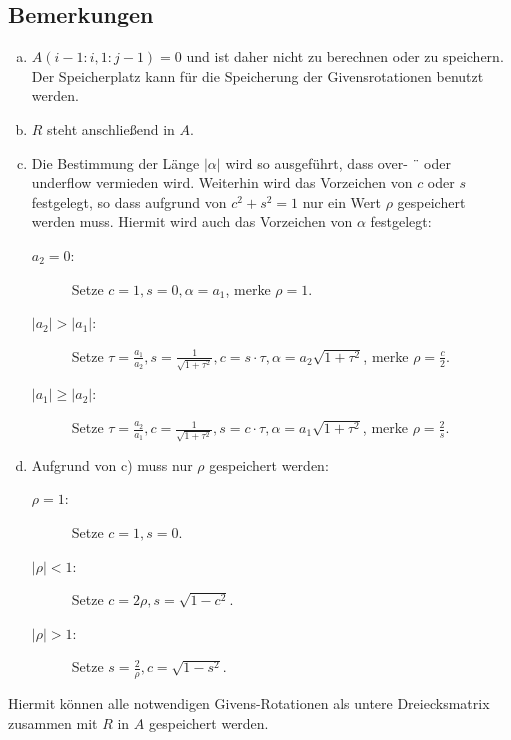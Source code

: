 \documentclass[ngerman,fontsize=11pt, paper=a4, parskip=half, titlepage=true, toc=bib]{scrbook}
\begin{document}
	\subsection{Bemerkungen} 
	\begin{enumerate}[a)]
		\item $A(i-1 : i, 1 : j-1) = 0$ und ist daher nicht zu berechnen oder
					zu speichern. Der Speicherplatz kann für die Speicherung der
					Givensrotationen benutzt werden.
		\item  $R$ steht anschließend in $A$.
		\item Die Bestimmung der Länge $|\alpha|$ wird so ausgeführt, dass over- ¨
				oder underflow vermieden wird. Weiterhin wird das Vorzeichen
				von $c$ oder $s$ festgelegt, so dass aufgrund von $c^2+s^2=1$ nur
				ein Wert $\rho$ gespeichert werden muss. Hiermit wird auch das
				Vorzeichen von $\alpha$ festgelegt:\\
				\begin{description}
					\item[$a_2=0$:] Setze $c=1, s=0, \alpha = a_1$, merke $\rho=1$.
					\item[$|a_2|>|a_1|$:] Setze $\tau= \frac{a_1}{a_2}, s=\frac{1}{\sqrt{1+\tau^2}}, c=s\cdot\tau, \alpha =a_2\sqrt{1+\tau^2}$, merke $\rho=\frac{c}{2}$.
					\item[$|a_1|\geq|a_2|$:] Setze $\tau= \frac{a_2}{a_1}, c=\frac{1}{\sqrt{1+\tau^2}}, s=c\cdot\tau, \alpha =a_1\sqrt{1+\tau^2}$, merke $\rho=\frac{2}{s}$.
				\end{description}
		\item Aufgrund von c) muss nur $\rho$ gespeichert werden:
		\begin{description}
			\item[$\rho=1$:] Setze $c=1, s=0$.
			\item[$|\rho|<1$:] Setze $c=2\rho , s= \sqrt{1-c^2}$.
			\item[$|\rho|>1$:] Setze $s=\frac{2}{\rho}, c=\sqrt{1-s^2}$.
		\end{description}
	\end{enumerate}
	Hiermit können alle notwendigen Givens-Rotationen als untere
	Dreiecksmatrix zusammen mit $R$ in $A$ gespeichert werden.
	
	
	
\end{document}
